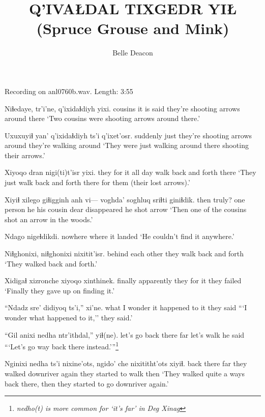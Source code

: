 \documentclass[12pt]{article}
\begin{document}
\title{Q'IVAŁDAL TIXGEDR YIŁ \newline(Spruce Grouse and Mink)}

\author{Belle Deacon}
\date{}

\maketitle

Recording on anl0760b.wav. Length:  3:55

\bigskip

\gll Niɬedaye, tr'i'ne, q'ixidaɬdiyh yixi. 
cousins {it is said} {they're shooting arrows around} there
\glt `Two cousins were shooting arrows around there.'
\glend

\gll Uxuxuyiɬ yan' q'ixidaɬdiyh ts'i q'ixet'osr.
suddenly just {they're shooting arrows around} {} {they're walking around}
\glt `They were just walking around there shooting their arrows.'
\glend

\gll Xiyoqo dran nigi(ti)t'isr yixi.
{they for it} {all day} {walk back and forth} there
\glt `They just walk back and forth there for them (their lost arrows).'
\glend

\gll Xiyiɬ xilego giɬigginh anh vi--- voghda' soghluq sriɬti giniɬdik.
then truly? {one person} he {} {his cousin} dear disappeared {he shot arrow}
\glt `Then one of the cousins shot an arrow in the woods.'
\glend

\gll Ndago nigeɬdikdi.
nowhere {where it landed}
\glt `He couldn't find it anywhere.'
\glend

\gll Niɬghonixi, niɬghonixi nixitit'isr.
{behind each other} {} {they walk back and forth}
\glt `They walked back and forth.'
\glend

\gll Xidigaɬ xizronche xiyoqo xinthinek.
finally apparently {they for it} {they failed}
\glt `Finally they gave up on finding it.'
\glend

\gll ``Ndadz sre' didiyoq ts'i,'' xi'ne.
what {I wonder} {it happened to it} {} {they said}
\glt ```I wonder what happened to it,'' they said.'
\glend

\gll ``Gil anixi nedha ntr'ithdal,'' yiɬ(ne).
{let's go} {back there} far {let's walk} {he said}
\glt ```Let's go way back there instead.'''\footnote{\em nedho(t) \em is more common for `it's far' in Deg Xinag}
\glend

\gll Nginixi nedha ts'i nixine'ots, ngido' che nixititht'ots xiyiɬ.
{back there} far {} {they walked} {downriver} again {they started to walk} then
\glt `They walked quite a ways back there, then they started to go downriver again.'
\glend
\end{document}
